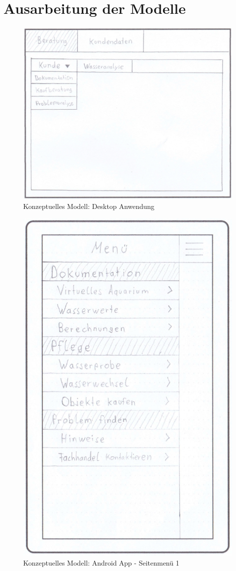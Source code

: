 \section{Ausarbeitung der Modelle}

\begin{figure}[htbp]
\centering
\includegraphics[width=\linewidth]{KModell1}
\caption{Konzeptuelles Modell: Desktop Anwendung}
\end{figure}

\begin{figure}[htbp]
\centering
\includegraphics[width=0.4\linewidth]{KModell2_1}
\caption{Konzeptuelles Modell: Android App - Seitenmenü 1}
\end{figure}

